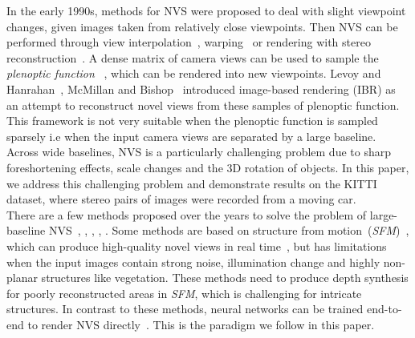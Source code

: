 \documentclass[runningheads]{llncs}
\begin{document}
In the early 1990s, methods for NVS were proposed to deal with slight viewpoint changes, given images taken from relatively close viewpoints. Then NVS can be performed through view interpolation~\cite{chen_and_wiiliams}, warping~\cite{seitz} or rendering with stereo reconstruction~\cite{scharstein1996stereo}. A dense matrix of camera views can be used to sample the \textit{plenoptic function} ~\cite{adelson1991plenoptic}, which can be rendered into new viewpoints. Levoy and Hanrahan~\cite{levoy1996light}, McMillan and Bishop~\cite{mcmillan1995plenoptic} introduced image-based rendering (IBR) as an attempt to reconstruct novel views from these samples of plenoptic function. This framework is not very suitable when the plenoptic function is sampled sparsely i.e when the input camera views are separated by a large baseline. Across wide baselines, NVS is a particularly challenging problem due to sharp foreshortening effects, scale changes and the 3D rotation of objects. In this paper, we address this challenging problem and demonstrate results on the KITTI dataset, where stereo pairs of images were recorded from a moving car.
\newline \\
There are a few methods proposed over the years to solve the problem of large-baseline NVS~\cite{chaurasia2013depth}, \cite{zitnick2004high}, \cite{flynn2015deepstereo}, \cite{goesele2010ambient}, \cite{penner2017soft}. Some methods are based on structure from motion~(\textit{SFM})~\cite{zitnick2004high}, which can produce high-quality novel views in real time~\cite{chaurasia2013depth}, but has limitations when the input images contain strong noise, illumination change and highly non-planar structures like vegetation. These methods need to produce depth synthesis for poorly reconstructed areas in \textit{SFM}, which is challenging for intricate structures. In contrast to these methods, neural networks can be trained end-to-end to render NVS directly~\cite{flynn2015deepstereo}. This is the paradigm we follow in this paper.
\end{document}
